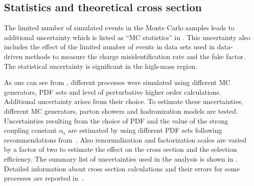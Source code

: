 \subsection{Statistics and theoretical cross section}
The limited number of simulated events in the Monte Carlo samples leads to additional uncertainty which is listed as ``MC statistics'' in .
This uncertainty also includes the effect of the limited number of events in data sets used in data-driven methods to measure the charge misidentification rate and the fake factor.
The statistical uncertainty is significant in the high-mass region.

As one can see from , different processes were simulated using different MC generators, PDF sets and level of perturbative higher order calculations.
Additional uncertainty arises from  their choice.
To estimate these uncertainties, different MC generators, parton showers and hadronization models are tested.
Uncertainties resulting from the choice of PDF and the value of the strong coupling constant $\alpha_{\mathrm{s}}$ are
estimated by using different PDF sets following recommendations from~\cite{pdf4lhc}.
Also renormalization and factorization scales are varied by a factor of two to estimate the effect on the cross section and the selection efficiency.
The summary list of uncertainties used in the analysis is shown in .
Detailed information about cross section calculations and their errors for some processes 
are reported in~\cite{diboson_cross_section,ttW_cross_section,ttV_cross_section}.

